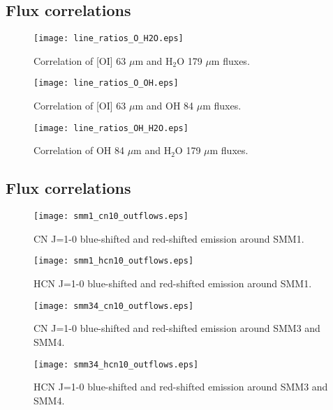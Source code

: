\documentclass{aa}
\begin{document}
\begin{appendix} %
\section{Flux correlations}

\begin{figure}
\texttt{[image: line\_ratios\_O\_H2O.eps]}
\caption{Correlation of [OI] 63 $\mu$m and H$_2$O 179 $\mu$m fluxes.}
\label{h13cn10}
\end{figure}

\begin{figure}
\texttt{[image: line\_ratios\_O\_OH.eps]}
\caption{Correlation of [OI] 63 $\mu$m and OH 84 $\mu$m fluxes.}
\label{h13cn10}
\end{figure}

\begin{figure}
\texttt{[image: line\_ratios\_OH\_H2O.eps]}
\caption{Correlation of OH 84 $\mu$m and H$_2$O 179 $\mu$m fluxes.}
\label{h13cn10}
\end{figure}

\end{appendix}

\begin{appendix} %
\section{Flux correlations}

\begin{figure}
\texttt{[image: smm1\_cn10\_outflows.eps]}
\caption{CN J=1-0 blue-shifted and red-shifted emission around SMM1.}
\label{h13cn10}
\end{figure}

\begin{figure}
\texttt{[image: smm1\_hcn10\_outflows.eps]}
\caption{HCN J=1-0 blue-shifted and red-shifted emission around SMM1.}
\label{h13cn10}
\end{figure}

\begin{figure}
\texttt{[image: smm34\_cn10\_outflows.eps]}
\caption{CN J=1-0 blue-shifted and red-shifted emission around SMM3 and SMM4.}
\label{h13cn10}
\end{figure}

\begin{figure}
\texttt{[image: smm34\_hcn10\_outflows.eps]}
\caption{HCN J=1-0 blue-shifted and red-shifted emission around SMM3 and SMM4.}
\label{h13cn10}
\end{figure}

\end{appendix}
\end{document}
